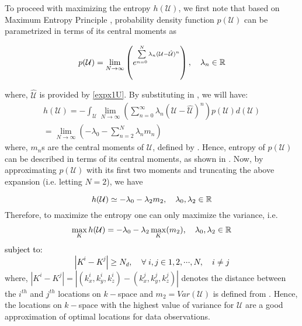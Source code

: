 \documentclass{article}         %
\theoremstyle{definition}
\theoremstyle{remark}
\begin{document}
To proceed with maximizing the entropy $h(\mathcal{U})$, we first note that
based on Maximum Entropy Principle \cite{cover2012elements}, probability
density function $p(\mathcal{U})$ can be parametrized in terms of its central
moments as

\begin{equation}\label{pu_entropy}
p(\mathcal{U})=\lim_{N\rightarrow \infty} \left(e^{\sum\limits_{n=0}^N \lambda_n (\mathcal{U}-\hat{\mathcal{U}})^n}\right),\quad \lambda_n \in \mathbb R
\end{equation}

where, $\hat{\mathcal{U}}$ is provided by \eqref{expx1U}. By substituting
 in , we will have: $  $
\begin{align}
h(\mathcal{U})=-\int_{\mathcal{U}} \lim_{N\rightarrow \infty} \left(\sum\limits_{n=0}^\infty \lambda_n (\mathcal{U}-\hat{\mathcal{U}})^n\right) p(\mathcal{U})d(\mathcal{U})\nonumber\\
= \lim_{N \rightarrow \infty} (-\lambda_0 - \sum\limits_{n=2}^{N} \lambda_n m_n) \label{entropy_moments}
\end{align}
where, $m_n$s are the central moments of $\mathcal{U}$, defined by . Hence, entropy of $p(\mathcal{U})$ can be described in terms of its central moments, as shown in . Now, by approximating $p(\mathcal{U})$ with its first two moments and truncating the above expansion (i.e. letting $N=2$), we have 

\begin{equation}\label{entropy_var}
h(\mathcal{U})\simeq -\lambda_0-\lambda_2 m_2,\quad \lambda_0,\lambda_2 \in \mathbb R
\end{equation}
Therefore, to maximize the entropy one can only maximize the variance, i.e.
\begin{eqnarray}\label{entropy_var_max}
\max_{K} h(\mathcal{U})= -\lambda_0 -\lambda_2 \max_{K}(m_2), \quad \lambda_0,\lambda_2 \in \mathbb R
\end{eqnarray}
\textcolor{black}{subject to:
\begin{equation}\label{sparsity_con}
|K^i-K^j|\geq N_d,\quad \forall\ i,j\in 1,2,\cdots,N,\quad i\neq j 
\end{equation}}
where, $|K^i-K^j|=|(k_x^i,k_y^i,k_z^i)-(k_x^j,k_y^j,k_z^j)|$ denotes the
distance between the $i^{th}$ and $j^{th}$ locations on $k-$space and
$m_2=Var(\mathcal{U})$ is defined from . Hence, the locations on
$k-$space with the highest value of variance for $\mathcal{U}$ are a good
approximation of optimal locations for data observations. 
\end{document}
